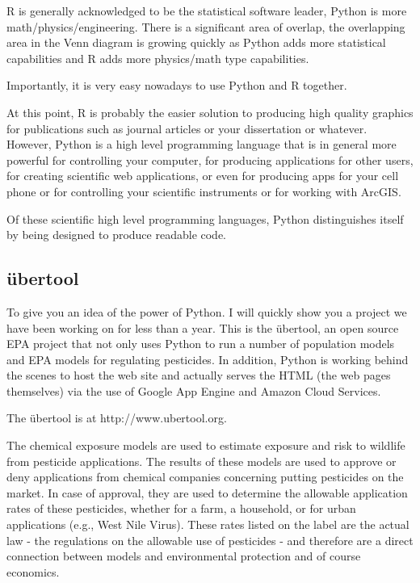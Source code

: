 \documentclass[12pt, A4]{article}
\begin{document}
R is generally acknowledged to be the statistical software leader, Python is more math/physics/engineering.  There is a significant area of overlap, the overlapping area in the Venn diagram is growing quickly as Python adds more statistical capabilities and R adds more physics/math type capabilities.

Importantly, it is very easy nowadays to use Python and R together.

At this point, R is probably the easier solution to producing high quality graphics for publications such as journal articles or your dissertation or whatever.  However, Python is a high level programming language that is in general more powerful for controlling your computer, for producing applications for other users, for creating scientific web applications, or even for producing apps for your cell phone or for controlling your scientific instruments or for working with ArcGIS.

Of these scientific high level programming languages, Python distinguishes itself by being designed to produce readable code.

\subsection{\"{u}bertool}
To give you an idea of the power of Python.  I will quickly show you a project we have been working on for less than a year.  This is the \"{u}bertool, an open source EPA project that not only uses Python to run a number of population models and EPA models for regulating pesticides.  In addition, Python is working behind the scenes to host the web site and actually serves the HTML (the web pages themselves) via the use of Google App Engine and Amazon Cloud Services.

The \"{u}bertool is at http://www.ubertool.org.

The chemical exposure models are used to estimate exposure and risk to wildlife from pesticide applications.  The results of these models are used to approve or deny applications from chemical companies concerning putting pesticides on the market.  In case of approval, they are used to determine the allowable application rates of these pesticides, whether for a farm, a household, or for urban applications (e.g., West Nile Virus). These rates listed on the label are the actual law - the regulations on the allowable use of pesticides - and therefore are a direct connection between models and environmental protection and of course economics.
\end{document}
